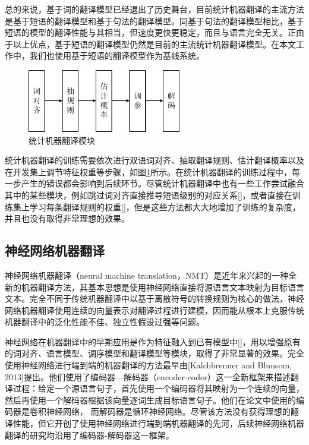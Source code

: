 总的来说，基于词的翻译模型已经退出了历史舞台，目前统计机器翻译的主流方法是基于短语的翻译模型和基于句法的翻译模型。同基于句法的翻译模型相比，基于短语的模型的翻译性能与其相当，但速度更快更稳定，而且与语言完全无关。正由于以上优点，基于短语的翻译模型仍然是目前的主流统计机器翻译模型。在本文工作中，我们也使用基于短语的翻译模型作为基线系统。

\begin{figure}[tb]
	\centering
	\includegraphics[width=0.6\textwidth]{Figure/Figure_2_5.pdf}
	\caption{统计机器翻译模块}
	\label{Fig_smt_modual}
\end{figure}

统计机器翻译的训练需要依次进行双语词对齐、抽取翻译规则、估计翻译概率以及在开发集上调节特征权重等步骤，如图\ref{Fig_smt_modual}所示。在统计机器翻译的训练过程中，每一步产生的错误都会影响到后续环节。尽管统计机器翻译中也有一些工作尝试融合其中的某些模块，例如跳过词对齐直接推导短语级别的对应关系[\cite{Cherry:2007,DeNero:2008,Zhang:2008c,Blunsom:2009,Neubig:2011,Levenberg:2012}]，或者直接在训练集上学习每条翻译规则的权重[\cite{Liang:2006,Yu:2013}]，但是这些方法都大大地增加了训练的复杂度，并且也没有取得非常理想的效果。

\subsection{神经网络机器翻译}

神经网络机器翻译（neural machine translation，NMT）是近年来兴起的一种全新的机器翻译方法，其基本思想是使用神经网络直接将源语言文本映射为目标语言文本。完全不同于传统机器翻译中以基于离散符号的转换规则为核心的做法，神经网络机器翻译使用连续的向量表示对翻译过程进行建模，因而能从根本上克服传统机器翻译中的泛化性能不佳、独立性假设过强等问题。

神经网络在机器翻译中的早期应用是作为特征融入到已有模型中[\cite{Yang:2013,Zou:2013,LiPeng:2013,Vaswani:2013,Tamura:2014,Gao:2014,Zhang:2014a,Zhang:2014b,Cui:2014,LiPeng:2014,Devlin:2014}]，用以增强原有的词对齐、语言模型、调序模型和翻译模型等模块，取得了非常显著的效果。完全使用神经网络进行端到端的机器翻译的方法最早由[Kalchbrenner and Blunsom, 2013]提出。他们使用了编码器—解码器（encoder-coder）这一全新框架来描述翻译过程：给定一个源语言句子，首先使用一个编码器将其映射为一个连续的向量，然后再使用一个解码器根据该向量逐词生成目标语言句子。他们在论文中使用的编码器是卷积神经网络， 而解码器是循环神经网络。尽管该方法没有获得理想的翻译性能，但它开创了使用神经网络进行端到端机器翻译的先河，后续神经网络机器翻译的研究均沿用了编码器-解码器这一框架。

